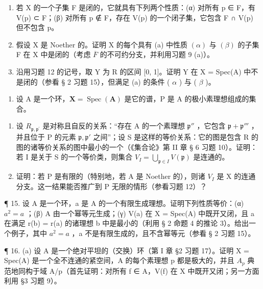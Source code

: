 \begin{enumerate}
\def\labelenumi{(\alph{enumi})}
\item
  若 X 的一个子集 F 是闭的，它就具有下列两个性质：(α) 对所有 p ∈ F，有 V(p) ⊂ F；(β) 对所有 p ∉ F，存在 V(p) 的一个闭子集，它包含 F ∩ V(p) 但不包含 p。
\item
  假设 X 是 Noether 的。证明 X 的每个具有 (a) 中性质 \((\alpha)\) 与 \((\beta)\) 的子集 F 在 X 中是闭的（考虑 \(\overline{F}\) 的不可约分支，并利用习题 9 (a)）。
\item
  沿用习题 12 的记号，取 Y 为 R 的区间 {[}0, 1{]}。证明 Y 在 X = Spec(A) 中不是闭的（参看 § 2 习题 15），但满足 (a) 的条件 ( \(\alpha\) ) 与 ( \(\beta\) )。
\end{enumerate}

\begin{enumerate}
\def\labelenumi{\arabic{enumi}.}
\setcounter{enumi}{13}
\tightlist
\item
  设 A 是一个环，\(\mathbf{X} = \operatorname{Spec}(\mathbf{A})\) 是它的谱，P 是 A 的极小素理想组成的集合。
\end{enumerate}

\begin{enumerate}
\def\labelenumi{(\alph{enumi})}
\item
  设 \(R_{\mathfrak{p},\mathfrak{p}^{\prime}}\) 是对称且自反的关系：“存在 A 的一个素理想 \(\mathfrak{p}''\) ，它包含 \(\mathfrak{p} + \mathfrak{p}'''\) ，并且位于 P 的元素 \(\mathfrak{p},\mathfrak{p}'\) 之间”；设 S 是这样的等价关系：它的图是包含 R 的图的诸等价关系的图中最小的一个（《集合论》第 II 章 § 6 习题 10）。证明：若 I 是关于 S 的一个等价类，则集合 \(V_{I} = \bigcup_{\mathfrak{p}\in I}V(\mathfrak{p})\) 是连通的。
\item
  证明：若 P 是有限的（特别地，若 A 是 Noether 的），则诸 \(V_{I}\) 是 X 的连通分支。这一结果能否推广到 P 无限的情形（参看习题 12）？
\end{enumerate}

¶ 15. 设 A 是一个环，a 是 A 的一个有限生成理想。证明下列性质等价：(α) \(a^{2} = a\) ；(β) A 由一个幂等元生成；(γ) V(a) 在 X = Spec(A) 中既开又闭，且 a 在满足 r(b) = r(a) 的诸理想 b 中是最小的（利用 § 2 命题 4 的推论 3）。给出一个例子，其中 \(a^{2} = a\) ，a 不是有限生成的，且不含幂等元（参看 § 2 习题 15）。

¶ 16. (a) 设 A 是一个绝对平坦的（交换）环（第 I 章 §2 习题 17）。证明 X = Spec(A) 是一个全不连通的紧空间，A 的每个素理想 p 都是极大的，并且 \(A_{p}\) 典范地同构于域 A/p（首先证明：对所有 f ∈ A，V(f) 在 X 中既开又闭；另一方面利用 §3 习题 9）。

